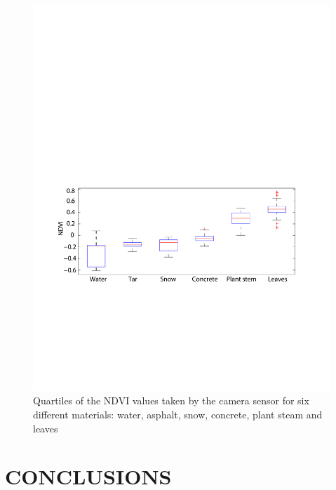 \documentclass[letterpaper, 10pt, conference]{ieeeconf}      %
\begin{document}
\begin{figure}[t]
      \vspace{2mm}\centering
      \includegraphics[trim = 1mm 75mm 1mm 132mm, clip,width=0.99\linewidth]{../images/experiment/boxplot_database2.pdf}\vspace{-3mm}
      \caption{Quartiles of the NDVI values taken by the camera sensor for six different materials: water, asphalt, snow, concrete, plant steam and leaves}
       \label{fig:boxplot}
       \vspace{-6mm}
   \end{figure}





 

\section{CONCLUSIONS}\label{sec:conclusions}
\end{document}
